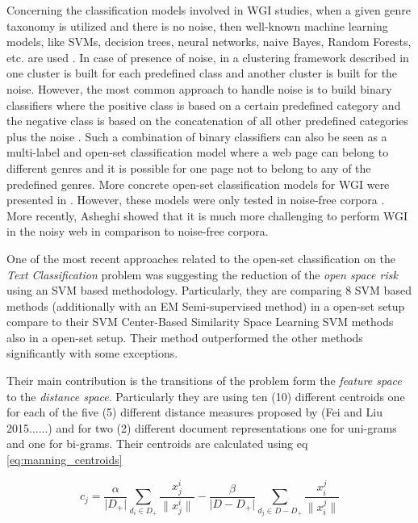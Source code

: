 Concerning the classification models involved in WGI studies, when a given genre taxonomy is utilized and there is no noise, then well-known machine learning models, like SVMs, decision trees, neural networks, naive Bayes, Random Forests, etc. are used \parencite{Lim2005,santini2007automatic,kanaris2009learning,jebari2015combination,sharoff2010web}. In case of presence of noise, in a clustering framework described in \parencite{kennedy2005automatic} one cluster is built for each predefined class and another cluster is built for the noise. However, the most common approach to handle noise is to build binary classifiers where the positive class is based on a certain predefined category and the negative class is based on the concatenation of all other predefined categories plus the noise \parencite{kennedy2005automatic,dong2006binary,levering2008using}. Such a combination of binary classifiers can also be seen as a multi-label and open-set classification model where a web page can belong to different genres and it is possible for one page not to belong to any of the predefined genres. More concrete open-set classification models for WGI were presented in \parencite{stubbe2007genre,pritsos2013open}. However, these models were only tested in noise-free corpora \parencite{pritsos2015clef}. More recently, Asheghi \parencite{Asheghi2015} showed that it is much more challenging to perform WGI in the noisy web in comparison to noise-free corpora.

One of the most recent approaches related to the open-set classification on the \textit{Text Classification} problem was suggesting the reduction of the \textit{open space risk} using an SVM based methodology. Particularly, they are comparing 8 SVM based methods (additionally with an EM Semi-supervised method) in a open-set setup compare to their SVM Center-Based Similarity Space Learning SVM methods also in a open-set setup. Their method outperformed the other methods significantly with some exceptions. 

Their main contribution is the transitions of the problem form the \textit{feature space} to the \textit{distance space}. Particularly they are using ten (10) different centroids one for each of the five (5) different distance measures proposed by (Fei and Liu 2015......) and for two (2) different document representations one for uni-grams and one for bi-grams. Their centroids are calculated using  eq \ref{eq:manning_centroids} 

\begin{equation}\label{eq:manning_centroids}
	c_{j} = \frac{\alpha}{\lvert D_{+} \rvert} \sum_{d_{i} \in D_{+}} \frac{x_{j}^{i}}{\lVert x_{j}^{i} \rVert } - \frac{\beta}{\lvert D - D_{+} \rvert} \sum_{d_{j} \in D - D_{+}} \frac{x_{i}^{j}}{\lVert x_{i}^{j} \rVert}
\end{equation}

